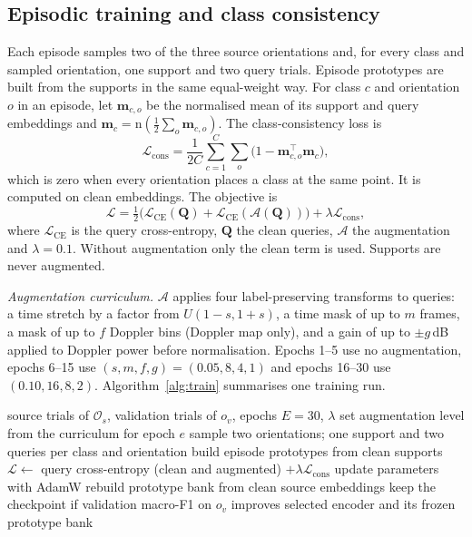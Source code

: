 \documentclass[conference]{IEEEtran}
\newcommand{\Lcons}{\mathcal{L}_{\mathrm{cons}}}
\newcommand{\Lce}{\mathcal{L}_{\mathrm{CE}}}
\begin{document}
\subsection{Episodic training and class consistency}
Each episode samples two of the three source orientations and, for every class and sampled orientation, one support and two query trials. Episode prototypes are built from the supports in the same equal-weight way. For class $c$ and orientation $o$ in an episode, let $\mathbf{m}_{c,o}$ be the normalised mean of its support and query embeddings and $\mathbf{m}_c=\mathrm{n}(\frac{1}{2}\sum_o\mathbf{m}_{c,o})$. The class-consistency loss is
\begin{equation}
\Lcons=\frac{1}{2C}\sum_{c=1}^{C}\sum_{o}\bigl(1-\mathbf{m}_{c,o}^{\top}\mathbf{m}_c\bigr),
\end{equation}
which is zero when every orientation places a class at the same point. It is computed on clean embeddings. The objective is
\begin{equation}
\mathcal{L}=\tfrac{1}{2}\bigl(\Lce(\mathbf{Q})+\Lce(\mathcal{A}(\mathbf{Q}))\bigr)+\lambda\Lcons,
\end{equation}
where $\Lce$ is the query cross-entropy, $\mathbf{Q}$ the clean queries, $\mathcal{A}$ the augmentation and $\lambda=0.1$. Without augmentation only the clean term is used. Supports are never augmented.

\textit{Augmentation curriculum.} $\mathcal{A}$ applies four label-preserving transforms to queries: a time stretch by a factor from $U(1-s,1+s)$, a time mask of up to $m$ frames, a mask of up to $f$ Doppler bins (Doppler map only), and a gain of up to $\pm g$\,dB applied to Doppler power before normalisation. Epochs 1--5 use no augmentation, epochs 6--15 use $(s,m,f,g)=(0.05,8,4,1)$ and epochs 16--30 use $(0.10,16,8,2)$. Algorithm~\ref{alg:train} summarises one training run.

\begin{algorithm}[t]
\caption{Training of the proposed model (C5)}
\label{alg:train}
\begin{algorithmic}[1]
\REQUIRE source trials of $\mathcal{O}_s$, validation trials of $o_v$, epochs $E=30$, $\lambda$
\STATE set augmentation level from the curriculum for epoch $e$
\STATE sample two orientations; one support and two queries per class and orientation
\STATE build episode prototypes from clean supports
\STATE $\mathcal{L}\leftarrow$ query cross-entropy (clean and augmented) $+\lambda\Lcons$
\STATE update parameters with AdamW
\ENDFOR
\STATE rebuild prototype bank from clean source embeddings
\STATE keep the checkpoint if validation macro-F1 on $o_v$ improves
\ENDFOR
\RETURN selected encoder and its frozen prototype bank
\end{algorithmic}
\end{algorithm}
\end{document}
